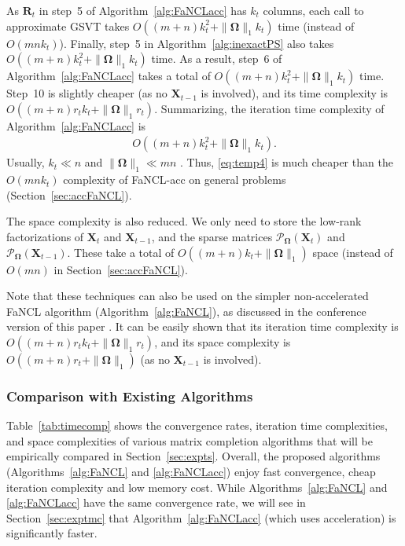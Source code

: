 \documentclass[10pt,journal,compsoc]{IEEEtran}
\newcommand{\X}{\mathbf{X}}
\newcommand{\NM}[2]{\| #1 \|_{#2} }
\newcommand{\SO}[1]{\mathcal{P}_{\mathbf{\Omega}}(#1)}
\begin{document}
As $\mathbf{R}_t$ in step~5 of Algorithm~\ref{alg:FaNCLacc}
has $k_t$ columns, each call to 
approximate GSVT takes
$O( (m + n)k_t^2 + \NM{\mathbf{\Omega}}{1} k_t )$ time \cite{quan2015impute}
(instead of $O( m n k_t ) $).
Finally, 
step~5
in Algorithm~\ref{alg:inexactPS}
also takes
$O ( (m + n) k_t^2 + \NM{\mathbf{\Omega}}{1} k_t )$ time.
As a result, 
step~6 of Algorithm~\ref{alg:FaNCLacc}
takes a total of
$O(  (m + n)k_t^2 + \NM{\mathbf{\Omega}}{1} k_t ) $
time.
Step~10 is slightly cheaper 
(as no $\X_{t-1}$ is involved),
and its time complexity is
$O( (m + n)r_t k_t + \NM{\mathbf{\Omega}}{1} r_t )$.
Summarizing, the iteration time complexity of Algorithm~\ref{alg:FaNCLacc} is 
\begin{align}
O( (m + n) k_t^2 + \NM{\mathbf{\Omega}}{1} k_t ).
\label{eq:temp4}
\end{align}
Usually,
$k_t \ll n$ and $\NM{\mathbf{\Omega}}{1} \ll mn$ \cite{candes2009exact,mazumder2010spectral}.
Thus, \eqref{eq:temp4} is much cheaper than
the $O(m n k_t)$ complexity of 
\textsf{FaNCL-acc} on general problems
(Section~\ref{sec:accFaNCL}).

The space complexity is also reduced.
We only need to store the low-rank factorizations of $\X_t$ and $\X_{t-1}$, and the sparse matrices $\SO{\X_t}$ and $\SO{\X_{t-1}}$.
These take a total of $O(  (m + n)k_t + \NM{\mathbf{\Omega}}{1} )$ space (instead of $O(m n)$ in Section~\ref{sec:accFaNCL}).

Note that  these techniques can also be used on 
the simpler non-accelerated \textsf{FaNCL} algorithm (Algorithm~\ref{alg:FaNCL}), 
as discussed in the conference version 
of this paper \cite{yao2015fast}.
It can be
easily shown that its
iteration time complexity is
$O( (m + n) r_t k_t + \NM{\mathbf{\Omega}}{1} r_t )$,
and
its space complexity is $O( (m + n)r_t + \NM{\mathbf{\Omega}}{1})$
(as 
no $\X_{t - 1}$
is involved).

\subsubsection{Comparison with Existing Algorithms}

Table~\ref{tab:timecomp} shows the 
convergence rates,
iteration time complexities, 
and
space complexities of various matrix completion algorithms that
will be empirically compared in Section~\ref{sec:expts}. 
Overall, the proposed 
algorithms (Algorithms~\ref{alg:FaNCL} and \ref{alg:FaNCLacc}) enjoy fast convergence, 
cheap iteration complexity and low memory cost.
While  
Algorithms~\ref{alg:FaNCL} and \ref{alg:FaNCLacc} have
the same
convergence rate,
we will see in Section~\ref{sec:exptmc} that Algorithm~\ref{alg:FaNCLacc} 
(which uses acceleration)
is significantly faster.
\end{document}
